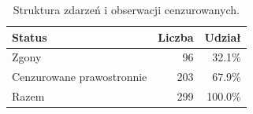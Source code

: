\begin{table}[htbp]
\centering
\caption{Struktura zdarzeń i obserwacji cenzurowanych.}
\label{tab:cenzurowanie}
\small
\setlength{\tabcolsep}{2.4pt}
\begin{tabular*}{.98\linewidth}{@{\extracolsep{\fill}}lrr}
\toprule
Status & Liczba & Udział \\
\midrule
Zgony & 96 & 32.1\% \\
Cenzurowane prawostronnie & 203 & 67.9\% \\
Razem & 299 & 100.0\% \\
\bottomrule
\end{tabular*}
\end{table}
